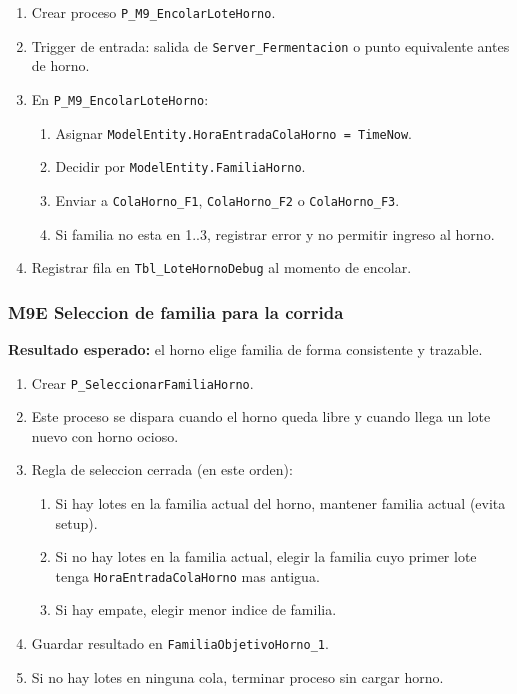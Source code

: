 \documentclass[11pt]{article}
\newcommand{\simio}[1]{\texttt{#1}}
\newcommand{\tabla}[1]{\texttt{#1}}
\newcommand{\state}[1]{\texttt{#1}}
\newcommand{\proc}[1]{\texttt{#1}}
\begin{document}
\begin{enumerate}
  \item Crear proceso \proc{P\_M9\_EncolarLoteHorno}.
  \item Trigger de entrada: salida de \simio{Server\_Fermentacion} o punto equivalente antes de horno.
  \item En \proc{P\_M9\_EncolarLoteHorno}:
  \begin{enumerate}
    \item Asignar \state{ModelEntity.HoraEntradaColaHorno = TimeNow}.
    \item Decidir por \state{ModelEntity.FamiliaHorno}.
    \item Enviar a \simio{ColaHorno\_F1}, \simio{ColaHorno\_F2} o \simio{ColaHorno\_F3}.
    \item Si familia no esta en 1..3, registrar error y no permitir ingreso al horno.
  \end{enumerate}
  \item Registrar fila en \tabla{Tbl\_LoteHornoDebug} al momento de encolar.
\end{enumerate}

\subsubsection{M9E Seleccion de familia para la corrida}
\textbf{Resultado esperado:} el horno elige familia de forma consistente y trazable.

\begin{enumerate}
  \item Crear \proc{P\_SeleccionarFamiliaHorno}.
  \item Este proceso se dispara cuando el horno queda libre y cuando llega un lote nuevo con horno ocioso.
  \item Regla de seleccion cerrada (en este orden):
  \begin{enumerate}
    \item Si hay lotes en la familia actual del horno, mantener familia actual (evita setup).
    \item Si no hay lotes en la familia actual, elegir la familia cuyo primer lote tenga \state{HoraEntradaColaHorno} mas antigua.
    \item Si hay empate, elegir menor indice de familia.
  \end{enumerate}
  \item Guardar resultado en \state{FamiliaObjetivoHorno\_1}.
  \item Si no hay lotes en ninguna cola, terminar proceso sin cargar horno.
\end{enumerate}
\end{document}
